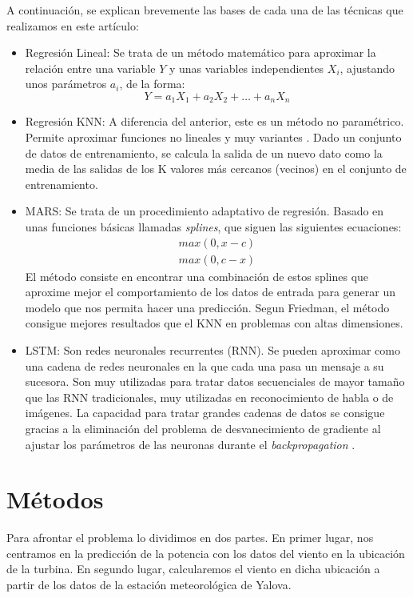 \documentclass[journal]{IEEEtran}
\begin{document}
A continuación, se explican brevemente las bases de cada una de las técnicas que realizamos en este artículo:
\begin{itemize}
    \item Regresión Lineal: Se trata de un método matemático para aproximar la relación entre una variable $Y$ y unas variables independientes $X_i$, ajustando unos parámetros $a_i$, de la forma:
\begin{equation}
\label{eqn:Reg}
 Y = a_1X_1 + a_2X_2+\ldots + a_nX_n
\end{equation}

    \item Regresión KNN: A diferencia del anterior, este es un método no paramétrico. Permite aproximar funciones no lineales y muy variantes \cite{James2013}. Dado un conjunto de datos de entrenamiento, se calcula la salida de un nuevo dato como la media de las salidas de los K valores más cercanos (vecinos) en el conjunto de entrenamiento.
    \item MARS: Se trata de un procedimiento adaptativo de regresión. Basado en unas funciones básicas llamadas \emph{splines}, que siguen las siguientes ecuaciones: 
    \begin{align*} 
        max(0,x-c) \\
        max(0,c-x)
    \end{align*}
    El método consiste en encontrar una combinación de estos splines que aproxime mejor el comportamiento de los datos de entrada para generar un modelo que nos permita hacer una predicción. Segun Friedman, \cite{JHFRIEDMAN1991} el método consigue mejores resultados que el KNN en problemas con altas dimensiones.
    \item LSTM: Son redes neuronales recurrentes (RNN). Se pueden aproximar como una cadena de redes neuronales en la que cada una pasa un mensaje a su sucesora. Son muy utilizadas para tratar datos secuenciales de mayor tamaño que las RNN tradicionales, muy utilizadas en reconocimiento de habla o de imágenes. La capacidad para tratar grandes cadenas de datos se consigue gracias a la eliminación del problema de desvanecimiento de gradiente al ajustar los parámetros de las neuronas durante el \emph{backpropagation} \cite{45500}.

\end{itemize}


 


\section{Métodos}
Para afrontar el problema lo dividimos en dos partes. En primer lugar, nos centramos en la predicción de la potencia con los datos del viento en la ubicación de la turbina. En segundo lugar, calcularemos el viento en dicha ubicación a partir de los datos de la estación meteorológica de Yalova. 
\end{document}
